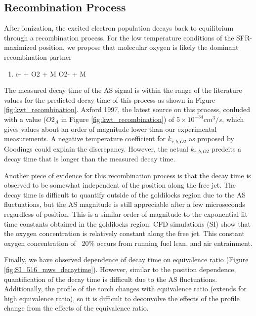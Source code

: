 \subsection{Recombination Process}

After ionization, the excited electron population decays back to equilibrium through a recombination process. For the low temperature conditions of the SFR-maximized position, we propose that molecular oxygen is likely the dominant recombination partner

\begin{enumerate}
\item e- + O2 + M \rightarrow O2- + M 
\end{enumerate}

The measured decay time of the AS signal is within the range of the literature values for the predicted decay time of this process as shown in Figure \ref{fig:kwt_recombination}. Axford 1997, the latest source on this process, conluded with a value ($O2_A$ in Figure \ref{fig:kwt_recombination}) of $5 \times 10^{-34} cm^3/s$, which gives values about an order of magnitude lower than our experimental measurements. A negative temperature coefficient for $k_{r,b,O2}$ as proposed by Goodings could explain the discrepancy. However, the actual $k_{r,b,O2}$ predcits a decay time that is longer than the measured decay time. 

Another piece of evidence for this recombination process is that the decay time is observed to be somewhat independent of the position along the free jet. The decay time is difficult to quantify outside of the goldilocks region due to the AS fluctuations, but the AS magnitude is still appreciable after a few microseconds regardless of position. This is a similar order of magnitude to the exponential fit time constants obtained in the goldilocks region. CFD simulations (SI) show that the oxygen concentration is relatively constant along the free jet. This constant oxygen concentration of ~20\% occurs from running fuel lean, and air entrainment.

Finally, we have observed dependence of decay time on equivalence ratio (Figure \ref*{fig:SI_516_mws_decaytime}). However, similar to the position dependence, quantification of the decay time is difficult due to the AS fluctuations. Additionally, the profile of the torch changes with equivalence ratio (extends for high equivalence ratio), so it is difficult to deconvolve the effects of the profile change from the effects of the equivalence ratio.



